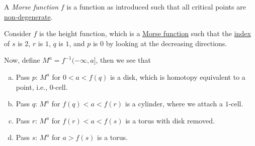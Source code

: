 \begin{definition}\label{def:Morse-function}
	A \emph{Morse function} \(f\) is a function as introduced such that all critical points are \hyperref[def:non-degenerate]{non-degenerate}.
\end{definition}

\begin{eg}
	Consider \(f\) is the height function, which is a \hyperref[def:Morse-function]{Morse function} such that the \hyperref[def:index-of-non-degenerate]{index} of \(s\) is \(2\), \(r\) is \(1\), \(q\) is \(1\), and \(p\) is \(0\) by looking at the decreasing directions.
	\begin{center}
	\end{center}
	Now, define \(M^a = f^{-1} (-\infty , a]\), then we see that
	\begin{enumerate}[(a)]
		\item Pass \(p\): \(M^a\) for \(0 < a < f(q)\) is a disk, which is homotopy equivalent to a point, i.e., \(0\)-cell.
		\item Pass \(q\): \(M^a\) for \(f(q) < a < f(r)\) is a cylinder, where we attach a \(1\)-cell.
		\item Pass \(r\): \(M^a\) for \(f(r) < a < f(s)\) is a torus with disk removed.
		\item Pass \(s\): \(M^a\) for \(a > f(s)\) is a torus.
	\end{enumerate}
\end{eg}